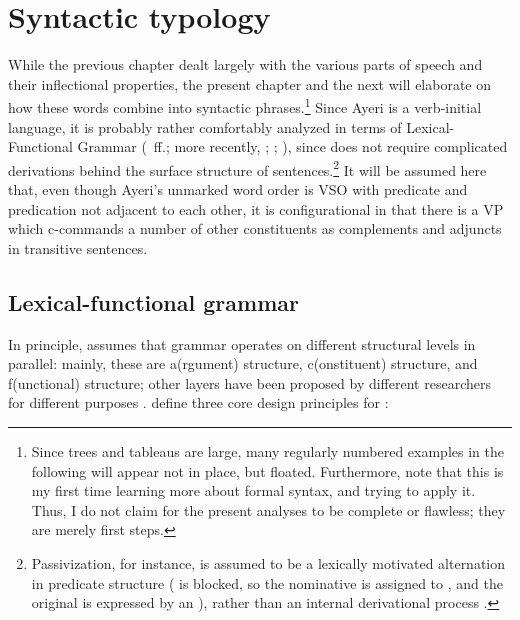 
\chapter{Syntactic typology}
\label{ch:syntyp}

While the previous chapter dealt largely with the various parts of speech and
their inflectional properties, the present chapter and the next will elaborate
on how these words combine into syntactic phrases.\footnote{Since trees and
tableaus are large, many regularly numbered examples in the following will
appear not in place, but floated. Furthermore, note that this is my first time
learning more about formal syntax, and trying to apply it. Thus, I do not claim
for the present analyses to be complete or flawless; they are merely first
steps.} Since Ayeri is a verb-initial language, it is probably rather
comfortably analyzed in terms of Lexical-Functional Grammar
(\cite{bresnan1982}~ff.; more recently, \cite{bresnan2016};
\cite{dalrymple2001}; \cite{falk2001}), since
\Lfg{} does not require complicated derivations behind the surface structure of
sentences.\footnote{Passivization, for instance, is assumed to be a lexically
motivated alternation in predicate structure (\Subj{} is blocked, so the
nominative is assigned to \Obj{}, and the original \Subj{} is expressed by an
), rather than an internal derivational process
\citep[23\psqq]{bresnan2016}.} It will be assumed here that, even though Ayeri's
unmarked word order is VSO with predicate and predication not
adjacent to each other, it is configurational in that there is
a VP which c-commands a number of other constituents as complements and
adjuncts in transitive sentences.

\section{Lexical-functional grammar}
\label{sec:lfg}

In principle, \Lfg{} assumes that grammar operates on different structural
levels in parallel: mainly, these are a(rgument) structure, c(onstituent)
structure, and f(unctional) structure; other layers have been proposed by
different researchers for different purposes \citep[862--865]{buttking2015}.
\citet{bresnan2016} define three core design principles for \Lfg{}:

